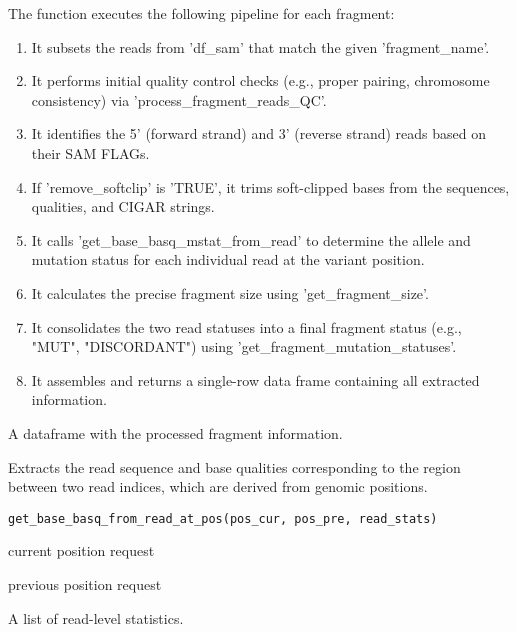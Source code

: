 \documentclass[a4paper]{book}
\begin{document}
%
\begin{Details}
The function executes the following pipeline for each fragment:
\begin{enumerate}

\item{} It subsets the reads from 'df\_sam' that match the given 'fragment\_name'.
\item{} It performs initial quality control checks (e.g., proper pairing,
chromosome consistency) via 'process\_fragment\_reads\_QC'.
\item{} It identifies the 5' (forward strand) and 3' (reverse strand) reads
based on their SAM FLAGs.
\item{} If 'remove\_softclip' is 'TRUE', it trims soft-clipped bases from the
sequences, qualities, and CIGAR strings.
\item{} It calls 'get\_base\_basq\_mstat\_from\_read' to determine the allele and
mutation status for each individual read at the variant position.
\item{} It calculates the precise fragment size using 'get\_fragment\_size'.
\item{} It consolidates the two read statuses into a final fragment status
(e.g., "MUT", "DISCORDANT") using 'get\_fragment\_mutation\_statuses'.
\item{} It assembles and returns a single-row data frame containing all
extracted information.

\end{enumerate}

\end{Details}
%
\begin{Value}
A dataframe with the processed fragment information.
\end{Value}
%
\begin{Description}
Extracts the read sequence and base qualities corresponding to the region between two read indices,
which are derived from genomic positions.
\end{Description}
%
\begin{Usage}
\begin{verbatim}
get_base_basq_from_read_at_pos(pos_cur, pos_pre, read_stats)
\end{verbatim}
\end{Usage}
%
\begin{Arguments}
\begin{ldescription}
\item[\code{pos\_cur}] current position request

\item[\code{pos\_pre}] previous position request

\item[\code{read\_stats}] A list of read-level statistics.
\end{ldescription}
\end{Arguments}
\end{document}
